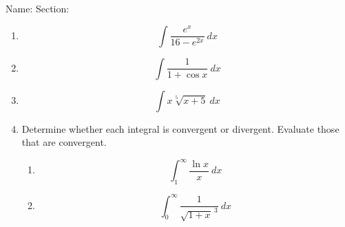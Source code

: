 \documentclass[12pt]{article}
\begin{document}
\noindent Name: \hspace{4in}Section:
\vspace{0.5cm}



\begin{enumerate}
\item \[\int \frac{e^x}{16-e^{2x}}\:dx\]
\vfill

\item \[\int \frac{1}{1+\cos{x}} \: dx\] \vfill




\newpage
\item \[\int x \sqrt[5]{x+5}\: dx \]
\vfill

\item Determine whether each integral is convergent or divergent. Evaluate those that are convergent.
\begin{enumerate}
\item \[\int_1^\infty \frac{\ln{x}}{x} \:dx \]
\vfill
\item \[\int_0^\infty\frac{1}{\sqrt{1+x}^{\:3}}\:dx \]
\vfill
\end{enumerate}

 




\end{enumerate}
\end{document}
